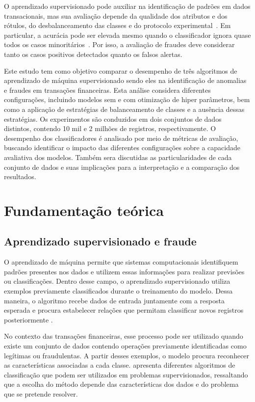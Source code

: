 \documentclass[11pt,a4paper]{article}
\begin{document}
O aprendizado supervisionado pode auxiliar na identificação de padrões em dados transacionais, mas sua avaliação depende da qualidade dos atributos e dos rótulos, do desbalanceamento das classes e do protocolo experimental~\cite{TONG2023110984,MOTIE2024122156}. Em particular, a acurácia pode ser elevada mesmo quando o classificador ignora quase todos os casos minoritários~\cite{10.1145/3343440}. Por isso, a avaliação de fraudes deve considerar tanto os casos positivos detectados quanto os falsos alertas.

Este estudo tem como objetivo comparar o desempenho de três algoritmos de aprendizado de máquina supervisionado sendo eles na identificação de anomalias e fraudes em transações financeiras. Esta análise considera diferentes configurações, incluindo modelos sem e com otimização de hiper parâmetros, bem como a aplicação de estratégias de balanceamento de classes e a ausência dessas estratégias. Os experimentos são conduzidos em dois conjuntos de dados distintos, contendo 10 mil e 2 milhões de registros, respectivamente. O desempenho dos classificadores é analisado por meio de métricas de avaliação, buscando identificar o impacto das diferentes configurações sobre a capacidade avaliativa dos modelos. Também sera discutidas as particularidades de cada conjunto de dados e suas implicações para a interpretação e a comparação dos resultados.

\section{Fundamentação teórica}

\subsection{Aprendizado supervisionado e fraude}

O aprendizado de máquina permite que sistemas computacionais identifiquem padrões presentes nos dados e utilizem essas informações para realizar previsões ou classificações. Dentro desse campo, o aprendizado supervisionado utiliza exemplos previamente classificados durante o treinamento do modelo. Dessa maneira, o algoritmo recebe dados de entrada juntamente com a resposta esperada e procura estabelecer relações que permitam classificar novos registros posteriormente \cite{Mohri2018}.

No contexto das transações financeiras, esse processo pode ser utilizado quando existe um conjunto de dados contendo operações previamente identificadas como legítimas ou fraudulentas. A partir desses exemplos, o modelo procura reconhecer as características associadas a cada classe. \cite{Geron2019} apresenta diferentes algoritmos de classificação que podem ser utilizados em problemas supervisionados, ressaltando que a escolha do método depende das características dos dados e do problema que se pretende resolver.
\end{document}
